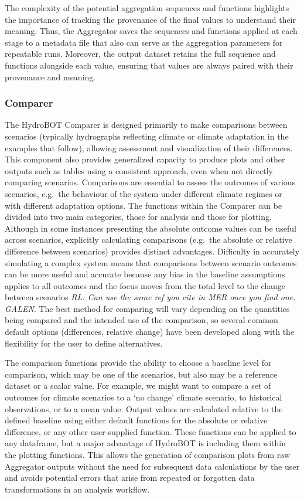 \documentclass[
  number]{elsarticle}
\begin{document}
The complexity of the potential aggregation sequences and functions
highlights the importance of tracking the provenance of the final values
to understand their meaning. Thus, the Aggregator saves the sequences
and functions applied at each stage to a metadata file that also can
serve as the aggregation parameters for repeatable runs. Moreover, the
output dataset retains the full sequence and functions alongside each
value, ensuring that values are always paired with their provenance and
meaning.

\hypertarget{sec-comparer}{%
\subsubsection{Comparer}\label{sec-comparer}}

The HydroBOT Comparer is designed primarily to make comparisons between
scenarios (typically hydrographs reflecting climate or climate
adaptation in the examples that follow), allowing assessment and
visualization of their differences. This component also provides
generalized capacity to produce plots and other outputs such as tables
using a consistent approach, even when not directly comparing scenarios.
Comparisons are essential to assess the outcomes of various scenarios,
e.g.~the behaviour of the system under different climate regimes or with
different adaptation options. The functions within the Comparer can be
divided into two main categories, those for analysis and those for
plotting. Although in some instances presenting the absolute outcome
values can be useful across scenarios, explicitly calculating
comparisons (e.g.~the absolute or relative difference between scenarios)
provides distinct advantages. Difficulty in accurately simulating a
complex system means that comparisons between scenario outcomes can be
more useful and accurate because any bias in the baseline assumptions
applies to all outcomes and the focus moves from the total level to the
change between scenarios \emph{RL: Can use the same ref you cite in MER
once you find one. GALEN}. The best method for comparing will vary
depending on the quantities being compared and the intended use of the
comparison, so several common default options (differences, relative
change) have been developed along with the flexibility for the user to
define alternatives.

The comparison functions provide the ability to choose a baseline level
for comparison, which may be one of the scenarios, but also may be a
reference dataset or a scalar value. For example, we might want to
compare a set of outcomes for climate scenarios to a `no change' climate
scenario, to historical observations, or to a mean value. Output values
are calculated relative to the defined baseline using either default
functions for the absolute or relative difference, or any other
user-supplied function. These functions can be applied to any dataframe,
but a major advantage of HydroBOT is including them within the plotting
functions. This allows the generation of comparison plots from raw
Aggregator outputs without the need for subsequent data calculations by
the user and avoids potential errors that arise from repeated or
forgotten data transformations in an analysis workflow.
\end{document}
